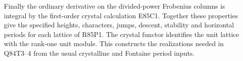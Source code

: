 Finally the ordinary derivative on the divided-power Frobenius
columns is integral by the first-order crystal calculation E85C1.
Together these properties give the specified heights, characters,
jumps, descent, stability and horizontal periods for each lattice
of R85P1. The crystal functor identifies the unit lattice with the
rank-one unit module. This constructs the realizations needed in
Q84T3--4 from the usual crystalline and Fontaine period inputs.
